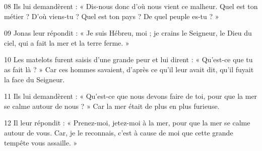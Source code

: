 
08 Ils lui demandèrent : « Dis-nous donc d’où nous vient ce malheur. Quel est ton métier ? D’où viens-tu ? Quel est ton pays ? De quel peuple es-tu ? »

09 Jonas leur répondit : « Je suis Hébreu, moi ; je crains le Seigneur, le Dieu du ciel, qui a fait la mer et la terre ferme. »

10 Les matelots furent saisis d’une grande peur et lui dirent : « Qu’est-ce que tu as fait là ? » Car ces hommes savaient, d’après ce qu’il leur avait dit, qu’il fuyait la face du Seigneur.

11 Ils lui demandèrent : « Qu’est-ce que nous devons faire de toi, pour que la mer se calme autour de nous ? » Car la mer était de plus en plus furieuse.

12 Il leur répondit : « Prenez-moi, jetez-moi à la mer, pour que la mer se calme autour de vous. Car, je le reconnais, c’est à cause de moi que cette grande tempête vous assaille. »